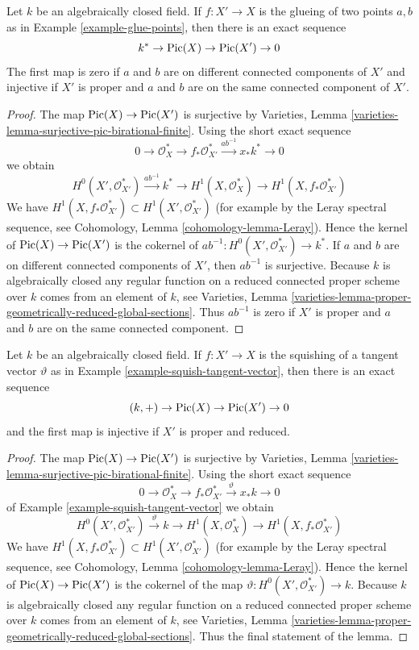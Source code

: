 \begin{lemma}
\label{lemma-glue-points}
Let $k$ be an algebraically closed field. If $f : X' \to X$ is the
glueing of two points $a, b$ as in Example \ref{example-glue-points}, then
there is an exact sequence
$$
k^* \to \mathop{\mathrm{Pic}}\nolimits(X) \to \mathop{\mathrm{Pic}}\nolimits(X') \to 0
$$
The first map is zero if $a$ and $b$ are on different
connected components of $X'$ and injective
if $X'$ is proper and $a$ and $b$ are on the same connected component of $X'$.
\end{lemma}

\begin{proof}
The map $\mathop{\mathrm{Pic}}\nolimits(X) \to \mathop{\mathrm{Pic}}\nolimits(X')$ is surjective
by Varieties, Lemma \ref{varieties-lemma-surjective-pic-birational-finite}.
Using the short exact sequence
$$
0 \to \mathcal{O}_X^* \to f_*\mathcal{O}_{X'}^*
\xrightarrow{ab^{-1}} x_*k^* \to 0
$$
we obtain
$$
H^0(X', \mathcal{O}_{X'}^*) \xrightarrow{ab^{-1}} k^* \to
H^1(X, \mathcal{O}_X^*) \to H^1(X, f_*\mathcal{O}_{X'}^*)
$$
We have $H^1(X, f_*\mathcal{O}_{X'}^*) \subset H^1(X', \mathcal{O}_{X'}^*)$
(for example by the Leray spectral sequence, see
Cohomology, Lemma \ref{cohomology-lemma-Leray}).
Hence the kernel of $\mathop{\mathrm{Pic}}\nolimits(X) \to \mathop{\mathrm{Pic}}\nolimits(X')$ is the
cokernel of $ab^{-1} : H^0(X', \mathcal{O}_{X'}^*) \to k^*$.
If $a$ and $b$ are on different connected components of $X'$,
then $ab^{-1}$ is surjective.
Because $k$ is algebraically closed any regular function on a
reduced connected proper scheme over $k$ comes from an element of $k$, see
Varieties, Lemma
\ref{varieties-lemma-proper-geometrically-reduced-global-sections}.
Thus $ab^{-1}$ is zero if $X'$ is proper and $a$ and $b$ are on
the same connected component.
\end{proof}

\begin{lemma}
\label{lemma-squish-tangent-vector}
Let $k$ be an algebraically closed field. If $f : X' \to X$ is the
squishing of a tangent vector $\vartheta$ as in
Example \ref{example-squish-tangent-vector}, then
there is an exact sequence
$$
(k, +) \to \mathop{\mathrm{Pic}}\nolimits(X) \to \mathop{\mathrm{Pic}}\nolimits(X') \to 0
$$
and the first map is injective if $X'$ is proper and reduced.
\end{lemma}

\begin{proof}
The map $\mathop{\mathrm{Pic}}\nolimits(X) \to \mathop{\mathrm{Pic}}\nolimits(X')$ is surjective
by Varieties, Lemma \ref{varieties-lemma-surjective-pic-birational-finite}.
Using the short exact sequence
$$
0 \to \mathcal{O}_X^* \to f_*\mathcal{O}_{X'}^*
\xrightarrow{\vartheta} x_*k \to 0
$$
of Example \ref{example-squish-tangent-vector} we obtain
$$
H^0(X', \mathcal{O}_{X'}^*) \xrightarrow{\vartheta} k \to
H^1(X, \mathcal{O}_X^*) \to H^1(X, f_*\mathcal{O}_{X'}^*)
$$
We have $H^1(X, f_*\mathcal{O}_{X'}^*) \subset H^1(X', \mathcal{O}_{X'}^*)$
(for example by the Leray spectral sequence, see
Cohomology, Lemma \ref{cohomology-lemma-Leray}).
Hence the kernel of $\mathop{\mathrm{Pic}}\nolimits(X) \to \mathop{\mathrm{Pic}}\nolimits(X')$ is the
cokernel of the map $\vartheta : H^0(X', \mathcal{O}_{X'}^*) \to k$.
Because $k$ is algebraically closed any regular function on a
reduced connected proper scheme over $k$ comes from an element of $k$, see
Varieties, Lemma
\ref{varieties-lemma-proper-geometrically-reduced-global-sections}.
Thus the final statement of the lemma.
\end{proof}


